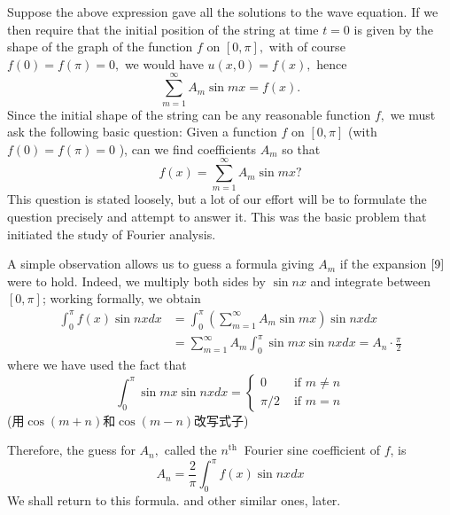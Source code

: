 \documentclass[12pt]{book}
\theoremstyle{definition}\newtheorem{dfn}{Définition}[chapter]
\theoremstyle{plain}\newtheorem{thm}{Théorème}[chapter]
\theoremstyle{plain}\newtheorem{prp}{Proposition}[chapter]
\theoremstyle{plain}\newtheorem{lem}{\bf Lemme}[chapter]
\theoremstyle{plain}\newtheorem{axm}{\bf Axiome}[chapter]
\theoremstyle{plain}\newtheorem{lmm}{\bf Lemme}[chapter]
\theoremstyle{plain}\newtheorem{exm}{\bf Example}[chapter]
\theoremstyle{plain}\newtheorem{cor}{\bf Corollaire}[chapter]
\theoremstyle{remark}\newtheorem{rem}{Remarque}[chapter]
\begin{document}
Suppose the above expression gave all the solutions to the wave equation. If we then require that the initial position of the string at time $t=0$ is given by the shape of the graph of the function $f$ on $[0, \pi],$ with of course $f(0)=f(\pi)=0,$ we would have $u(x, 0)=f(x),$ hence
$$
\sum_{m=1}^{\infty} A_{m} \sin m x=f(x).$$
Since the initial shape of the string can be any reasonable function $f,$ we must ask the following basic question:
Given a function $f$ on $[0, \pi]$ (with $f(0)=f(\pi)=0$ ), can we find coefficients $A_{m}$ so that
\begin{equation}
f(x)=\sum_{m=1}^{\infty} A_{m} \sin m x ?\label{9}
\end{equation}
This question is stated loosely, but a lot of our effort will be to formulate the question precisely and attempt to answer it. This was the basic problem that initiated the study of Fourier analysis.

A simple observation allows us to guess a formula giving $A_{m}$ if the expansion $\ref{9}$ were to hold. Indeed, we multiply both sides by $\sin n x$ and integrate between $[0, \pi]$; working formally, we obtain
$$
\begin{aligned}
\int_{0}^{\pi} f(x) \sin n x d x &=\int_{0}^{\pi}\left(\sum_{m=1}^{\infty} A_{m} \sin m x\right) \sin n x d x \\
&=\sum_{m=1}^{\infty} A_{m} \int_{0}^{\pi} \sin m x \sin n x d x=A_{n} \cdot \frac{\pi}{2}
\end{aligned}
$$
where we have used the fact that
$$
\int_{0}^{\pi} \sin m x \sin n x d x=\left\{\begin{array}{ll}
0 & \text { if } m \neq n \\
\pi / 2 & \text { if } m=n
\end{array}\right.
$$
(用$\cos(m+n)$和$\cos(m-n)$改写式子)

Therefore, the guess for $A_{n},$ called the $n^{\text {th }}$ Fourier sine coefficient of $f$, is
\begin{equation}
A_{n}=\frac{2}{\pi} \int_{0}^{\pi} f(x) \sin n x d x
\end{equation}
We shall return to this formula. and other similar ones, later.
\end{document}
